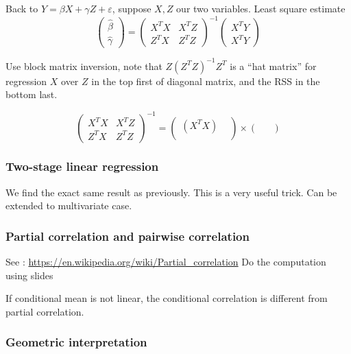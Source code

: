 \documentclass[
]{article}
\begin{document}
Back to \(Y=\beta X+\gamma Z+\varepsilon\), suppose \(X, Z\) our two
variables. Least square estimate \[
\begin{pmatrix}\hat{\beta}\\\hat{\gamma}\end{pmatrix}=\begin{pmatrix}X^T X & X^T Z\\Z^T X & Z^T Z\end{pmatrix}^{-1}\begin{pmatrix}X^T Y\\X^T Y\end{pmatrix}
\]

Use block matrix inversion, note that \(Z(Z^T Z)^{-1}Z^T\) is a ``hat
matrix'' for regression \(X\) over \(Z\) in the top first of diagonal
matrix, and the RSS in the bottom last.

\[
\begin{pmatrix}X^T X & X^T Z\\Z^T X & Z^T Z\end{pmatrix}^{-1}=\begin{pmatrix}(X^T X) &\\&\end{pmatrix}\times\begin{pmatrix} &\\ &\end{pmatrix}
\]

\hypertarget{two-stage-linear-regression}{%
\subsubsection{Two-stage linear
regression}\label{two-stage-linear-regression}}

We find the exact same result as previously. This is a very useful
trick. Can be extended to multivariate case.

\hypertarget{partial-correlation-and-pairwise-correlation}{%
\subsubsection{Partial correlation and pairwise
correlation}\label{partial-correlation-and-pairwise-correlation}}

See : \url{https://en.wikipedia.org/wiki/Partial_correlation} Do the
computation using slides

If conditional mean is not linear, the conditional correlation is
different from partial correlation.

\hypertarget{geometric-interpretation}{%
\subsubsection{Geometric
interpretation}\label{geometric-interpretation}}
\end{document}
